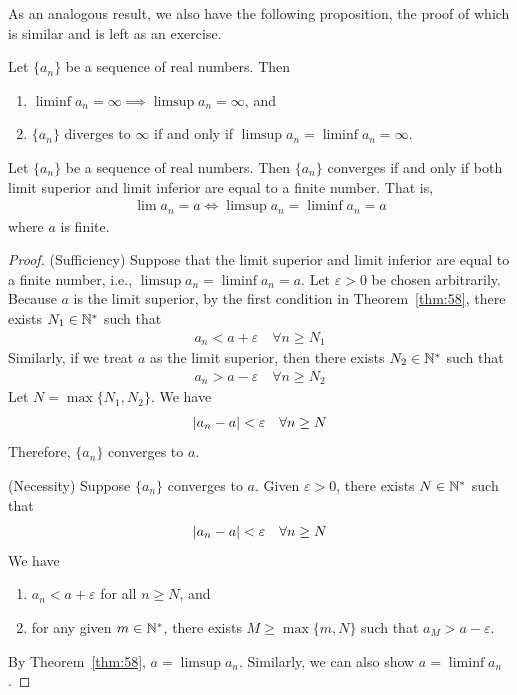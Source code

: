 \documentclass[thmcnt=section, 12pt]{my-elegantbook}
\begin{document}
As an analogous result, we also have the following proposition, the proof of which is similar and is left as an exercise.

\begin{proposition} \label{pro:4}
    Let $\{a_n\}$ be a sequence of real numbers. Then
    \begin{enumerate}
        \item $\liminf a_n = \infty \implies \limsup a_n = \infty$, and
        \item $\{a_n\}$ diverges to $\infty$ if and only if $\limsup a_n = \liminf a_n = \infty$.
    \end{enumerate}
\end{proposition}


\begin{proposition} \label{pro:5}
    Let $\{a_n\}$ be a sequence of real numbers. Then $\{a_n\}$ converges if and only if both limit superior and limit inferior are equal to a finite number. That is,
    \begin{align*}
        \lim a_n = a
        \iff
        \limsup a_n = \liminf a_n = a
    \end{align*}
    where $a$ is finite.
\end{proposition}

\begin{proof}
    (Sufficiency) Suppose that the limit superior and limit inferior are equal to a finite number, i.e.,  $\limsup a_n = \liminf a_n = a$. Let $\varepsilon > 0$ be chosen arbitrarily. Because $a$ is the limit superior, by the first condition in Theorem~\ref{thm:58}, there exists $N_1 \in \mathbb{N}^\ast$ such that
    \begin{align*}
        a_n < a + \varepsilon
        \quad \forall n \geq N_1
    \end{align*}
    Similarly, if we treat $a$ as the limit superior, then there exists $N_2 \in \mathbb{N}^\ast$ such that
    \begin{align}
        a_n > a - \varepsilon
        \quad \forall n \geq N_2
    \end{align}
    Let $N = \max\{N_1, N_2\}$. We have
    \begin{align*}
        \left\lvert a_n - a \right\rvert < \varepsilon
        \quad \forall n \geq N
    \end{align*}
    Therefore, $\{a_n\}$ converges to $a$.

    (Necessity) Suppose $\{a_n\}$ converges to $a$. Given $\varepsilon > 0$, there exists $N \in \mathbb{N}^\ast$ such that
    \begin{align*}
        \left\lvert a_n - a \right\rvert < \varepsilon
        \quad \forall n \geq N
    \end{align*}
    We have
    \begin{enumerate}
        \item $a_n < a + \varepsilon$ for all $n \geq N$, and
        \item for any given $m \in \mathbb{N}^\ast$, there exists $M \geq \max\{m, N\}$ such that $a_M > a - \varepsilon$.
    \end{enumerate}
    By Theorem~\ref{thm:58}, $a = \limsup a_n$. Similarly, we can also show $a = \liminf a_n$.
\end{proof}
\end{document}

